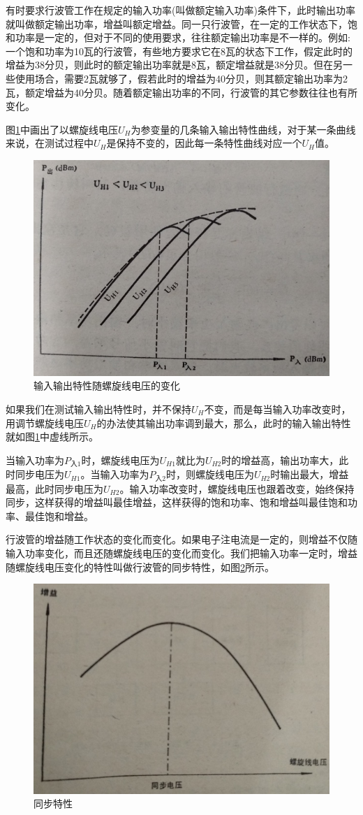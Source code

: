 有时要求行波管工作在规定的输入功率(叫做额定输入功率)条件下，此时输出功率就叫做额定输出功率，增益叫额定增益。同一只行波管，在一定的工作状态下，饱和功率是一定的，但对于不同的使用要求，往往额定输出功率是不一样的。例如:一个饱和功率为10瓦的行波管，有些地方要求它在8瓦的状态下工作，假定此时的增益为38分贝，则此时的额定输出功率就是8瓦，额定增益就是38分贝。但在另一些使用场合，需要2瓦就够了，假若此时的增益为40分贝，则其额定输出功率为2瓦，额定增益为40分贝。随着额定输出功率的不同，行波管的其它参数往往也有所变化。


图\ref{ch11-2}中画出了以螺旋线电压$ U_H $为参变量的几条输入输出特性曲线，对于某一条曲线来说，在测试过程中$ U_H $是保持不变的，因此每一条特性曲线对应一个$ U_H $值。


\begin{figure}[phtb]
	\centering
	\includegraphics[width=0.6\linewidth]{figure/ch11-2}
	\caption{输入输出特性随螺旋线电压的变化}
	\label{ch11-2}
\end{figure}

如果我们在测试输入输出特性时，并不保持$ U_H $不变，而是每当输入功率改变时，用调节螺旋线电压$ U_H $的办法使其输出功率调到最大，那么，此时的输入输出特性就如图\ref{ch11-2}中虚线所示。


当输入功率为$ P_{\textrm{入}1} $时，螺旋线电压为$ U_{H1} $就比为$ U_{H2} $时的增益高，输出功率大，此时同步电压为$  U_{H1} $。当输入功率为$ P_{\textrm{入}2} $时，则螺旋线电压为$ U_{H2} $时输出最大，增益最高，此时同步电压为$ U_{H2} $。输入功率改变时，螺旋线电压也跟着改变，始终保持同步，这样获得的增益叫最佳增益，这样获得的饱和功率、饱和增益叫最佳饱和功率、最佳饱和增益。


行波管的增益随工作状态的变化而变化。如果电子注电流是一定的，则增益不仅随输入功率变化，而且还随螺旋线电压的变化而变化。我们把输入功率一定时，增益随螺旋线电压变化的特性叫做行波管的同步特性，如图\ref{ch11-3}所示。

\begin{figure}[phtb]
	\centering
	\includegraphics[width=0.6\linewidth]{figure/ch11-3}
	\caption{同步特性}
	\label{ch11-3}
\end{figure}

